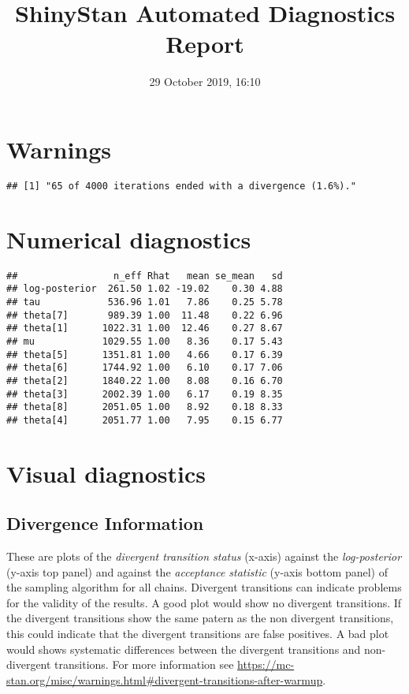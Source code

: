 \documentclass[11pt,]{article}
\title{ShinyStan Automated Diagnostics Report}
\author{}
\date{29 October 2019, 16:10}
\begin{document}
\maketitle

{
\setcounter{tocdepth}{2}
\tableofcontents
}
\hypertarget{warnings}{%
\section{Warnings}\label{warnings}}

\begin{verbatim}
## [1] "65 of 4000 iterations ended with a divergence (1.6%)."
\end{verbatim}

\newpage

\hypertarget{numerical-diagnostics}{%
\section{Numerical diagnostics}\label{numerical-diagnostics}}

\begin{verbatim}
##                 n_eff Rhat   mean se_mean   sd
## log-posterior  261.50 1.02 -19.02    0.30 4.88
## tau            536.96 1.01   7.86    0.25 5.78
## theta[7]       989.39 1.00  11.48    0.22 6.96
## theta[1]      1022.31 1.00  12.46    0.27 8.67
## mu            1029.55 1.00   8.36    0.17 5.43
## theta[5]      1351.81 1.00   4.66    0.17 6.39
## theta[6]      1744.92 1.00   6.10    0.17 7.06
## theta[2]      1840.22 1.00   8.08    0.16 6.70
## theta[3]      2002.39 1.00   6.17    0.19 8.35
## theta[8]      2051.05 1.00   8.92    0.18 8.33
## theta[4]      2051.77 1.00   7.95    0.15 6.77
\end{verbatim}

\newpage

\hypertarget{visual-diagnostics}{%
\section{Visual diagnostics}\label{visual-diagnostics}}

\hypertarget{divergence-information}{%
\subsection{Divergence Information}\label{divergence-information}}

These are plots of the \emph{divergent transition status} (x-axis)
against the \emph{log-posterior} (y-axis top panel) and against the
\emph{acceptance statistic} (y-axis bottom panel) of the sampling
algorithm for all chains. Divergent transitions can indicate problems
for the validity of the results. A good plot would show no divergent
transitions. If the divergent transitions show the same patern as the
non divergent transitions, this could indicate that the divergent
transitions are false positives. A bad plot would shows systematic
differences between the divergent transitions and non-divergent
transitions. For more information see
\url{https://mc-stan.org/misc/warnings.html\#divergent-transitions-after-warmup}.
\end{document}
